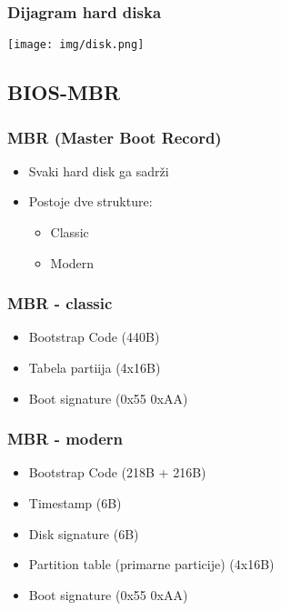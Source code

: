 \documentclass{beamer}
\begin{document}
\begin{frame}
    \frametitle{Dijagram hard diska}
    \begin{center}
        \texttt{[image: img/disk.png]}
    \end{center}
\end{frame}

\subsection*{BIOS-MBR}
\begin{frame}
    \frametitle{MBR (Master Boot Record)}
    \begin{itemize}
        \item Svaki hard disk ga sadrži \newline
        \item Postoje dve strukture: \begin{itemize}
            \item Classic \newline
            \item Modern 
        \end{itemize}
    \end{itemize}
\end{frame}

\begin{frame}
    
    \frametitle{MBR - classic}
    \begin{itemize}
        \item Bootstrap Code (440B) \newline
        \item Tabela partiija (4x16B) \newline
        \item Boot signature (0x55 0xAA) \newline 
    \end{itemize}
\end{frame}

\begin{frame}
    \frametitle{MBR - modern}
    \begin{itemize}
        \item Bootstrap Code (218B + 216B) \newline
        \item Timestamp (6B) \newline
        \item Disk signature (6B) \newline
        \item Partition table (primarne particije) (4x16B) \newline
        \item Boot signature (0x55 0xAA)
    \end{itemize}
\end{frame}
\end{document}
